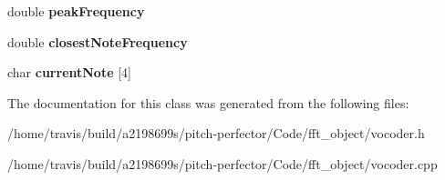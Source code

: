 \begin{DoxyCompactItemize}
\item 
\hypertarget{classVocoder_abae7bb20fa180d030d6a96f08af48429}{double {\bfseries peak\-Frequency}}\label{classVocoder_abae7bb20fa180d030d6a96f08af48429}

\item 
\hypertarget{classVocoder_a6550fbf8de5847c7d5a6fcb90b4f3c2b}{double {\bfseries closest\-Note\-Frequency}}\label{classVocoder_a6550fbf8de5847c7d5a6fcb90b4f3c2b}

\item 
\hypertarget{classVocoder_a41e36ebe0ebd3981e0cd12aedcc62f58}{char {\bfseries current\-Note} \mbox{[}4\mbox{]}}\label{classVocoder_a41e36ebe0ebd3981e0cd12aedcc62f58}

\end{DoxyCompactItemize}


The documentation for this class was generated from the following files\-:\begin{DoxyCompactItemize}
\item 
/home/travis/build/a2198699s/pitch-\/perfector/\-Code/fft\-\_\-object/vocoder.\-h\item 
/home/travis/build/a2198699s/pitch-\/perfector/\-Code/fft\-\_\-object/vocoder.\-cpp\end{DoxyCompactItemize}
